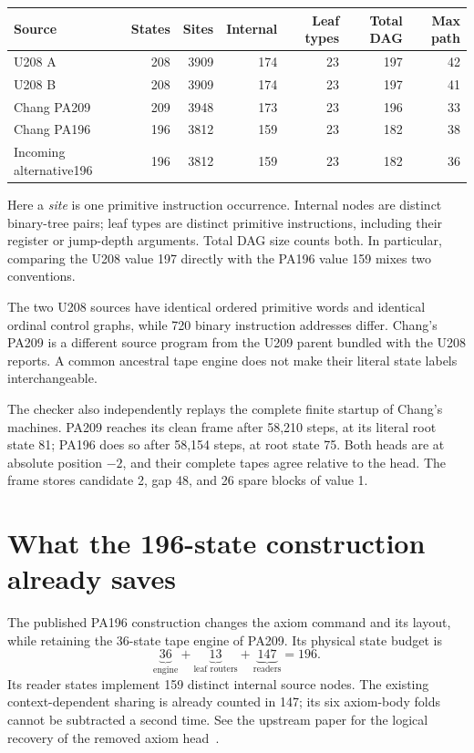 \begin{center}\small
\begin{tabular}{@{}lrrrrrr@{}}
\toprule
Source & States & Sites & Internal & Leaf types & Total DAG & Max path\\
\midrule
U208 A &208&3909&174&23&197&42\\
U208 B &208&3909&174&23&197&41\\
Chang PA209 &209&3948&173&23&196&33\\
Chang PA196 &196&3812&159&23&182&38\\
Incoming alternative196 &196&3812&159&23&182&36\\
\bottomrule
\end{tabular}
\end{center}
Here a \emph{site} is one primitive instruction occurrence. Internal nodes
are distinct binary-tree pairs; leaf types are distinct primitive
instructions, including their register or jump-depth arguments. Total DAG
size counts both. In particular, comparing the U208 value 197 directly with
the PA196 value 159 mixes two conventions.

The two U208 sources have identical ordered primitive words and identical
ordinal control graphs, while 720 binary instruction addresses differ.
Chang's PA209 is a different source program from the U209 parent bundled
with the U208 reports. A common ancestral tape engine does not make their
literal state labels interchangeable.

The checker also independently replays the complete finite startup of
Chang's machines. PA209 reaches its clean frame after 58,210 steps, at its
literal root state 81; PA196 does so after 58,154 steps, at root state 75.
Both heads are at absolute position $-2$, and their complete tapes agree
relative to the head. The frame stores candidate 2, gap 48, and 26 spare
blocks of value 1.

\section{What the 196-state construction already saves}

The published PA196 construction changes the axiom command and its layout,
while retaining the 36-state tape engine of PA209. Its physical state budget
is
\[
 \underbrace{36}_{\text{engine}}+
 \underbrace{13}_{\text{leaf routers}}+
 \underbrace{147}_{\text{readers}}=196.
\]
Its reader states implement 159 distinct internal source nodes. The existing
context-dependent sharing is already counted in 147; its six axiom-body
folds cannot be subtracted a second time. See the upstream paper for the
logical recovery of the removed axiom head~\cite{pa196paper}.

